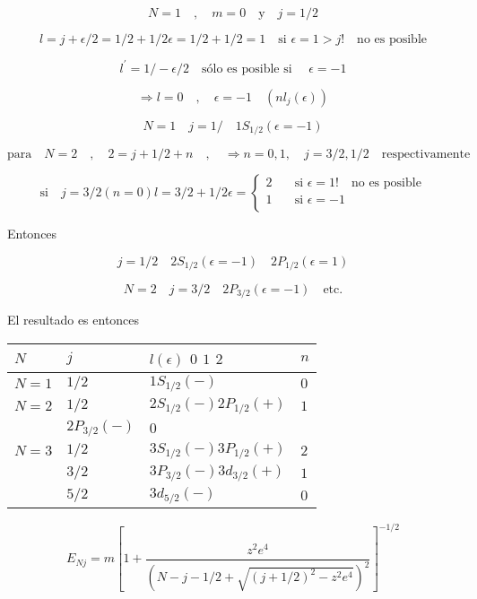 \documentclass{report}
\begin{document}
\[N=1 \quad , \quad m = 0 \quad \text{y} \quad j = 1/2 \]

\[l = j + \epsilon/2 = 1/2 + 1/2 \epsilon = 1/2+1/2 = 1 \quad \text{si } \epsilon = 1 > j ! \quad \text{no es posible}\]


\[l^{\prime } = 1/ - \epsilon/2  \quad \text{sólo es posible si } \quad \epsilon = -1 \]

\[\Rightarrow l = 0 \quad , \quad \epsilon=-1 \quad (n l_{j}(\epsilon))\]

\[N = 1 \quad j = 1/ \quad 1 S_{1/2}(\epsilon =-1)\]

\[\text{para} \quad N=2 \quad , \quad 2 = j+1/2 + n \quad , \quad \Rightarrow n = 0 , 1, \quad j = 3/2 , 1/2 \quad \text{respectivamente }\]

\[ \text{si} \quad j = 3/2 (n=0) l=3/2 + 1/2 \epsilon =
  \begin{cases}
    2       & \quad \text{si } \epsilon = 1 ! \quad \text{no es posible}\\
    1  & \quad \text{si } \epsilon = -1\\
  \end{cases}
\]

Entonces

\[j = 1/2 \quad 2 S_{1/2} (\epsilon = -1) \quad 2 P_{1/2 }(\epsilon=1)\]

\[N=2 \quad j = 3/2 \quad 2 P_{3/2}(\epsilon =-1 ) \quad \text{etc.}\]

El resultado es entonces

\begin{center}
    \begin{tabular}{ | l | l | l | p{5cm} |}
    \hline
    $N$ & $j$ & $l(\epsilon)$ $0$ $1$ $2$ & $n$ \\ \hline
    $N=1$ & $1/2$& $1S_{1/2}(-)$ & $0$ \\ \hline
    $N=2$ & $1/2$& $2S_{1/2}(-)2P_{1/2}(+)$ & $1$ \\ \hline
     & $2P_{3/2}(-)$ & $0$ \\ \hline
     $N=3$ & $1/2$ & $3S_{1/2}(-)3P_{1/2}(+)$ & $2$ \\ \hline
      & $3/2$ & $3P_{3/2}(-)3d_{3/2}(+)$ & $1$ \\ \hline
     & $5/2$ & $3d_{5/2}(-)$ & $0$ \\ \hline    
    \end{tabular}
\end{center}

\[E_{Nj} = m [1 + \frac{z^2 e^4 }{(N-j-1/2 +  \sqrt{(j+1/2)^2 - z ^2 e ^4})^2}]^{-1/2}\]
\end{document}
